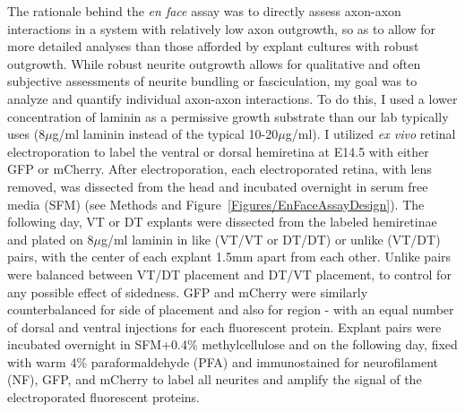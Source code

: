 The rationale behind the \emph{en face} assay was to directly assess axon-axon interactions in a system with relatively low axon outgrowth, so as to allow for more detailed analyses than those afforded by explant cultures with robust outgrowth.
While robust neurite outgrowth allows for qualitative and often subjective assessments of neurite bundling or fasciculation, my goal was to analyze and quantify individual axon-axon interactions.
To do this, I used a lower concentration of laminin as a permissive growth substrate than our lab typically uses (8$\mu$g/ml laminin instead of the typical 10-20$\mu$g/ml).
I utilized \emph{ex vivo} retinal electroporation \cite{petros2009utero} to label the ventral or dorsal hemiretina at E14.5 with either GFP or mCherry.
After electroporation, each electroporated retina, with lens removed, was dissected from the head and incubated overnight in serum free media (SFM) (see Methods and Figure~\ref{Figures/EnFaceAssayDesign}).
The following day, VT or DT explants were dissected from the labeled hemiretinae and plated on 8$\mu$g/ml laminin in like (VT/VT or DT/DT) or unlike (VT/DT) pairs, with the center of each explant 1.5mm apart from each other.
Unlike pairs were balanced between VT/DT placement and DT/VT placement, to control for any possible effect of sidedness.
GFP and mCherry were similarly counterbalanced for side of placement and also for region - with an equal number of dorsal and ventral injections for each fluorescent protein.
Explant pairs were incubated overnight in SFM+0.4\% methylcellulose and on the following day, fixed with warm 4\% paraformaldehyde (PFA) and immunostained for neurofilament (NF), GFP, and mCherry to label all neurites and amplify the signal of the electroporated fluorescent proteins.

